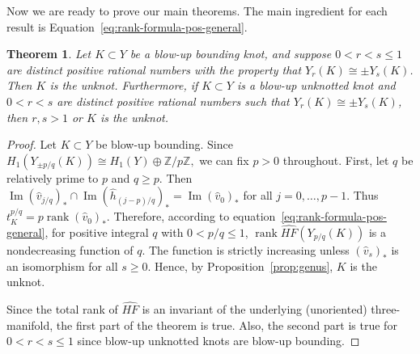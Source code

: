 \documentclass{article}
\newtheorem{theorem}[equation]{Theorem}
\theoremstyle{remark}
\numberwithin{equation}{section}
\numberwithin{table}{section}
\newcommand{\wh}{\widehat}
\DeclareMathOperator{\im}{Im}
\DeclareMathOperator{\rank}{rank}
\renewcommand{\(}{\left(}
\renewcommand{\)}{\right)}
\newcommand{\Z}{{\mathbb{Z}}}
\begin{document}
Now we are ready to prove our main theorems. The main ingredient for each result is Equation~\ref{eq:rank-formula-pos-general}.

\begin{theorem}
Let $K\subset Y$ be a blow-up bounding knot, and suppose $0<r<s\le 1$ are distinct positive rational numbers with the property that $Y_r(K)\cong\pm Y_s(K)$. Then $K$ is the unknot. Furthermore, if $K\subset Y$ is a blow-up unknotted knot and $0<r<s$ are distinct positive rational numbers such that $Y_r(K)\cong\pm Y_s(K)$, then $r,s>1$ or $K$ is the unknot.
\end{theorem}
\begin{proof}
Let $K\subset Y$ be blow-up bounding. Since $H_1(Y_{\pm p/q}(K))\cong H_1(Y)\oplus\Z/p\Z,$ we can fix $p>0$ throughout. First, let $q$ be relatively prime to $p$ and $q\ge p$. Then $\im(\wh v_{j/q})_* \cap \im(\wh h_{(j-p)/q})_*=\im(\wh v_0)_*$ for all $j=0,\dots,p-1$. Thus $t_K^{p/q}=p\rank(\wh v_0)_*$. Therefore, according to equation~\ref{eq:rank-formula-pos-general}, for positive integral $q$ with $0<p/q\le 1$, $\rank\wh{HF}(Y_{p/q}(K))$ is a nondecreasing function of $q$. The function is strictly increasing unless $(\wh v_s)_*$ is an isomorphism for all $s\ge 0$. Hence, by Proposition~\ref{prop:genus}, $K$ is the unknot.

Since the total rank of $\wh{HF}$ is an invariant of the underlying (unoriented) three-manifold, the first part of the theorem is true. Also, the second part is true for $0<r<s\le 1$ since blow-up unknotted knots are blow-up bounding.



\end{proof}
\end{document}
